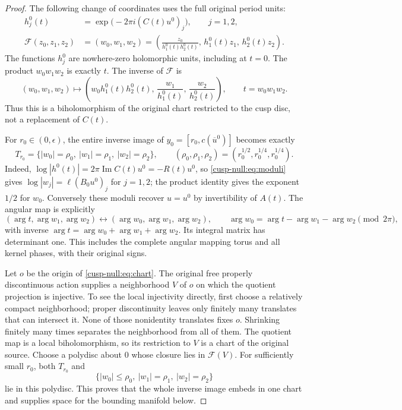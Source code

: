 \begin{proof}
The following change of coordinates uses the full original period units:
\begin{align}
 h_j^0(t)&=\exp\bigl(-2\pi i(C(t)u^0)_j\bigr),\qquad j=1,2,\\
 \mathcal F(z_0,z_1,z_2)
 &=(w_0,w_1,w_2)
 =\left(\frac{z_0}{h_1^0(t)h_2^0(t)},\,
 h_1^0(t)z_1,\,h_2^0(t)z_2\right).
 \label{cusp-null:eq:straightening}
\end{align}
The functions \(h_j^0\) are nowhere-zero holomorphic units, including
at \(t=0\). The product \(w_0w_1w_2\) is exactly \(t\).
The inverse of \(\mathcal F\) is
\[
 (w_0,w_1,w_2)\longmapsto
 \left(w_0h_1^0(t)h_2^0(t),\,
 \frac{w_1}{h_1^0(t)},\,\frac{w_2}{h_2^0(t)}\right),
 \qquad t=w_0w_1w_2.
\]
Thus this is a biholomorphism of the original chart restricted to the
cusp disc, not a replacement of \(C(t)\).

For \(r_0\in(0,\epsilon)\), the entire inverse image of
\(y_0=[r_0,c(\overline u^0)]\) becomes exactly
\begin{equation}
 T_{r_0}=
 \{|w_0|=\rho_0,\ |w_1|=\rho_1,\ |w_2|=\rho_2\},\qquad
 (\rho_0,\rho_1,\rho_2)=
 (r_0^{1/2},r_0^{1/4},r_0^{1/4}).
 \label{cusp-null:eq:torus}
\end{equation}
Indeed, \(\log|h^0(t)|=2\pi\operatorname{Im}C(t)u^0=-R(t)u^0\),
so \eqref{cusp-null:eq:moduli} gives \(\log|w_j|=\ell(B_0u^0)_j\) for
\(j=1,2\); the product identity gives the exponent \(1/2\) for
\(w_0\). Conversely these moduli recover \(u=u^0\) by invertibility
of \(A(t)\). The angular map is explicitly
\[
 (\arg t,\arg w_1,\arg w_2)\longleftrightarrow
 (\arg w_0,\arg w_1,\arg w_2),\qquad
 \arg w_0=\arg t-\arg w_1-\arg w_2\pmod{2\pi},
\]
with inverse \(\arg t=\arg w_0+\arg w_1+\arg w_2\).
Its integral matrix has determinant one. This includes the complete
angular mapping torus and all kernel phases, with their original signs.

Let \(o\) be the origin of \eqref{cusp-null:eq:chart}. The original free properly
discontinuous action supplies a neighborhood \(V\) of \(o\) on which
the quotient projection is injective. To see the local injectivity
directly, first choose a relatively compact neighborhood; proper
discontinuity leaves only finitely many translates that can intersect it.
None of those nonidentity translates fixes \(o\). Shrinking finitely
many times separates the neighborhood from all of them. The quotient
map is a local biholomorphism, so its restriction to \(V\) is a chart
of the original source.
Choose a polydisc about \(0\) whose closure lies in \(\mathcal F(V)\).
For sufficiently small \(r_0\), both \(T_{r_0}\) and
\begin{equation}
 \{|w_0|\leq\rho_0,\ |w_1|=\rho_1,\ |w_2|=\rho_2\}
 \label{cusp-null:eq:spatial-bound}
\end{equation}
lie in this polydisc. This proves that the whole inverse image embeds
in one chart and supplies space for the bounding manifold below.


\end{proof}
